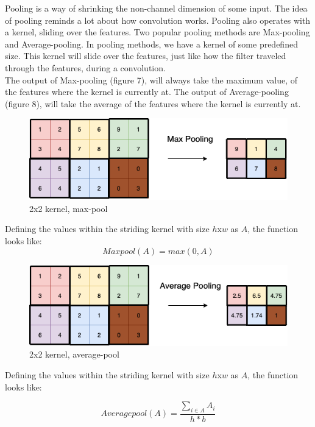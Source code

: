 Pooling is a way of shrinking the non-channel dimension of some input. The idea of pooling reminds a lot about how convolution works. Pooling also operates with a kernel, sliding over the features. Two popular pooling methods are Max-pooling and Average-pooling. In pooling methods, we have a kernel of some predefined size. This kernel will slide over the features, just like how the filter traveled through the features, during a convolution. \\

\noindent
The output of Max-pooling (figure 7), will always take the maximum value, of the features where the kernel is currently at. The output of Average-pooling (figure 8), will take the average of the features where the kernel is currently at. \\


\begin{figure}[!ht]
  \centering
  \includegraphics[scale=0.4]{latex/imgs/maxpooling.png}
  \caption{2x2 kernel, max-pool}\label{Baseline:before}
\end{figure}

\noindent
Defining the values within the striding kernel with size $h$x$w$ as $A$, the function looks like:
$$
Maxpool(A) = max(0,A)
$$

\begin{figure}[!ht]
  \centering
  \includegraphics[scale=0.4]{latex/imgs/averagepooling.png}
  \caption{2x2 kernel, average-pool}\label{Baseline:before}
\end{figure}

\noindent
Defining the values within the striding kernel with size $h$x$w$ as $A$, the function looks like:

$$
Averagepool(A) = \frac{\sum_{i \in A} A_i}{h * b}
$$
